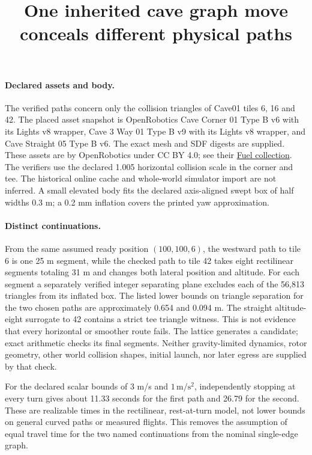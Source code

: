 \documentclass{article}
\begin{document}
\title{One inherited cave graph move conceals different physical paths}
\maketitle

\paragraph{Declared assets and body.}
The verified paths concern only the collision triangles of
Cave01 tiles 6, 16 and 42. The placed asset snapshot is
OpenRobotics Cave Corner 01 Type B v6 with its Lights v8
wrapper, Cave 3 Way 01 Type B v9 with its Lights v8
wrapper, and Cave Straight 05 Type B v6.
The exact mesh and SDF digests are supplied. These assets
are by OpenRobotics under CC BY 4.0; see their
\href{https://fuel.gazebosim.org/1.0/OpenRobotics/models}{Fuel collection}.
The verifiers use the declared 1.005 horizontal collision
scale in the corner and tee. The historical online cache
and whole-world simulator import are not inferred.
A small elevated body fits the declared axis-aligned
swept box of half widths 0.3 m; a 0.2 mm inflation
covers the printed yaw approximation.

\paragraph{Distinct continuations.}
From the same assumed ready position \((100,100,6)\),
the westward path to tile 6 is one 25 m segment,
while the checked path to tile 42 takes eight rectilinear
segments totaling 31 m and changes both lateral position
and altitude. For each segment a separately verified
integer separating plane excludes each of the 56,813
triangles from its inflated box. The listed lower bounds
on triangle separation for the two chosen paths are
approximately 0.654 and 0.094 m. The straight
altitude-eight surrogate to 42 contains a strict tee
triangle witness. This is not evidence that every
horizontal or smoother route fails.
The lattice generates a candidate; exact arithmetic
checks its final segments. Neither gravity-limited
dynamics, rotor geometry, other world collision shapes,
initial launch, nor later egress are supplied by that check.

For the declared scalar bounds of 3 m/s and
\(1\,\mathrm{m/s^2}\), independently stopping at every
turn gives about 11.33 seconds for the first path
and 26.79 for the second. These are realizable times
in the rectilinear, rest-at-turn model, not lower bounds
on general curved paths or measured flights. This removes
the assumption of equal travel time for the two named
continuations from the nominal single-edge graph.
\end{document}
